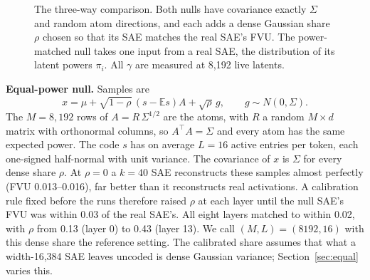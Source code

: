 \documentclass[10pt,twocolumn]{article}
\newcommand{\Sig}{\Sigma}
\begin{document}
\begin{figure}[t]
\centering
{}
\caption{The three-way comparison. Both nulls have covariance exactly $\Sig$ and random atom directions, and each adds a dense Gaussian share $\rho$ chosen so that its SAE matches the real SAE's FVU. The power-matched null takes one input from a real SAE, the distribution of its latent powers $\pi_i$. All $\gamma$ are measured at 8,192 live latents.}
\label{fig:schematic}
\end{figure}

\textbf{Equal-power null.} Samples are
\[ x = \mu + \sqrt{1-\rho}\,(s-\mathbb{E}s)A + \sqrt{\rho}\,g, \qquad g \sim N(0,\Sig). \]
The $M=8{,}192$ rows of $A = R\,\Sig^{1/2}$ are the atoms, with $R$ a random $M\times d$ matrix with orthonormal columns, so $A^\top A = \Sig$ and every atom has the same expected power. The code $s$ has on average $L=16$ active entries per token, each one-signed half-normal with unit variance. The covariance of $x$ is $\Sig$ for every dense share $\rho$. At $\rho=0$ a $k=40$ SAE reconstructs these samples almost perfectly (FVU 0.013--0.016), far better than it reconstructs real activations. A calibration rule fixed before the runs therefore raised $\rho$ at each layer until the null SAE's FVU was within 0.03 of the real SAE's. All eight layers matched to within 0.02, with $\rho$ from 0.13 (layer 0) to 0.43 (layer 13). We call $(M,L)=(8192,16)$ with this dense share the reference setting. The calibrated share assumes that what a width-16,384 SAE leaves uncoded is dense Gaussian variance; Section~\ref{sec:equal} varies this.
\end{document}
